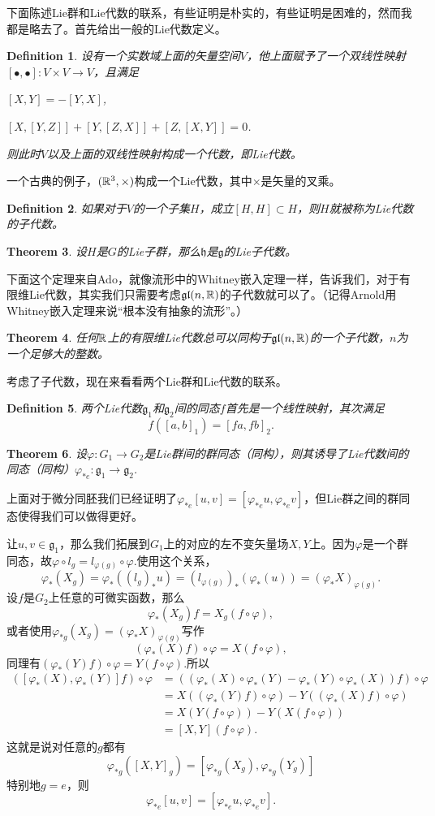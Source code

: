 \documentclass[8pt]{book}
\theoremstyle{plain}
\newtheorem{defi}{Definition}
\newtheorem{theo}[defi]{Theorem}
\newcommand{\lag}{{\mathfrak{g}}}  %
\begin{document}
下面陈述Lie群和Lie代数的联系，有些证明是朴实的，有些证明是困难的，然而我都是略去了。首先给出一般的Lie代数定义。
\begin{defi}
设有一个实数域上面的矢量空间$V$，他上面赋予了一个双线性映射$[\bullet,\bullet]:V\times V\to V$，且满足

 $[X,Y]=-[Y,X]$,

 $[X,[Y,Z]]+[Y,[Z,X]]+[Z,[X,Y]]=0$.

则此时$V$以及上面的双线性映射构成一个代数，即Lie代数。
\end{defi}

一个古典的例子，$(\mathbb{R}^3,\times)$构成一个Lie代数，其中$\times$是矢量的叉乘。

\begin{defi}
如果对于$V$的一个子集$H$，成立$[H,H]\subset H$，则$H$就被称为Lie代数的子代数。
\end{defi}
\begin{theo}
设$H$是$G$的Lie子群，那么$\mathfrak{h}$是$\lag$的Lie子代数。
\end{theo}
下面这个定理来自Ado，就像流形中的Whitney嵌入定理一样，告诉我们，对于有限维Lie代数，其实我们只需要考虑$\mathfrak{gl}(n,\mathbb{R})$的子代数就可以了。（记得Arnold用Whitney嵌入定理来说“根本没有抽象的流形”。）
\begin{theo}
任何$\mathbb{R}$上的有限维Lie代数总可以同构于$\mathfrak{gl}(n,\mathbb{R})$的一个子代数，$n$为一个足够大的整数。
\end{theo}

考虑了子代数，现在来看看两个Lie群和Lie代数的联系。
\begin{defi}
两个Lie代数$\lag_1$和$\lag_2$间的同态$f$首先是一个线性映射，其次满足
\[
f([a,b]_1)=[fa,fb]_2.
\]
\end{defi}
\begin{theo}
设$\varphi:G_1\to G_2$是Lie群间的群同态（同构），则其诱导了Lie代数间的同态（同构）$\varphi_{*e}:\lag_1\to \lag_2$.
\end{theo}
上面对于微分同胚我们已经证明了$\varphi_{*e}[u,v]=[\varphi_{*e}u,\varphi_{*e}v]$，但Lie群之间的群同态使得我们可以做得更好。

让$u,v\in\lag_1$，那么我们拓展到$G_1$上的对应的左不变矢量场$X,Y$上。因为$\varphi$是一个群同态，故$\varphi\circ l_g=l_{\varphi(g)}\circ \varphi$.使用这个关系，
\[
	\varphi_{*}(X_g)=\varphi_{*}((l_g)_*u)=(l_{\varphi(g)})_*(\varphi_{*}(u))=(\varphi_{*}X)_{\varphi(g)}.
\]
设$f$是$G_2$上任意的可微实函数，那么
\[
\varphi_{*}(X_g)f=X_g(f\circ \varphi),
\]
或者使用$\varphi_{*g}(X_g)=(\varphi_{*}X)_{\varphi(g)}$写作
\[
(\varphi_{*}(X)f)\circ \varphi=X(f\circ \varphi),
\]
同理有$(\varphi_{*}(Y)f)\circ \varphi=Y(f\circ \varphi)$.所以
\[
	\begin{split}
		([\varphi_*(X),\varphi_*(Y)]f)\circ \varphi&=((\varphi_*(X)\circ\varphi_*(Y)-\varphi_*(Y)\circ\varphi_*(X))f)\circ \varphi\\
		&=X((\varphi_*(Y)f)\circ \varphi)-Y((\varphi_*(X)f)\circ \varphi)\\
		&=X(Y(f\circ \varphi))-Y(X(f\circ \varphi))\\
		&=[X,Y](f\circ \varphi).
	\end{split}
\]
这就是说对任意的$g$都有
\[
	\varphi_{*g}([X,Y]_g)=[\varphi_{*g}(X_g),\varphi_{*g}(Y_g)]
\]
特别地$g=e$，则
\[
	\varphi_{*e}[u,v]=[\varphi_{*e}u,\varphi_{*e}v].
\]
\end{document}

